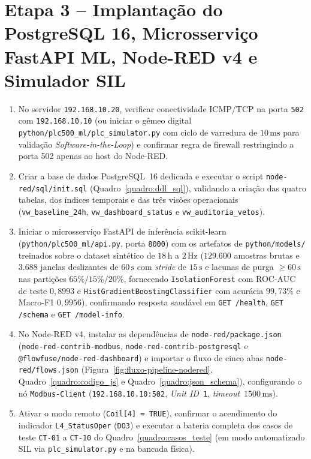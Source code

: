 \section{Etapa 3 -- Implantação do PostgreSQL 16, Microsserviço FastAPI ML, Node-RED v4 e Simulador SIL}
\begin{enumerate}
  \item No servidor \texttt{192.168.10.20}, verificar conectividade ICMP/TCP na porta \texttt{502} com \texttt{192.168.10.10} (ou iniciar o gêmeo digital \texttt{python/\allowbreak plc500\_\allowbreak ml/\allowbreak plc\_\allowbreak simulator.py} com ciclo de varredura de $10\,\text{ms}$ para validação \textit{Software-in-the-Loop}) e confirmar regra de firewall restringindo a porta 502 apenas ao host do Node-RED.
  \item Criar a base de dados PostgreSQL~16 dedicada e executar o script \texttt{node-red/\allowbreak sql/\allowbreak init.sql} (Quadro~\ref{quadro:ddl_sql}), validando a criação das quatro tabelas, dos índices temporais e das três visões operacionais (\texttt{vw\_\allowbreak baseline\_\allowbreak 24h}, \texttt{vw\_\allowbreak dashboard\_\allowbreak status} e \texttt{vw\_\allowbreak auditoria\_\allowbreak vetos}).
  \item Iniciar o microsserviço FastAPI de inferência scikit-learn (\texttt{python/\allowbreak plc500\_\allowbreak ml/\allowbreak api.py}, porta \texttt{8000}) com os artefatos de \texttt{python/\allowbreak models/} treinados sobre o dataset sintético de $18\,\text{h}$ a $2\,\text{Hz}$ ($129.600$ amostras brutas e $3.688$ janelas deslizantes de $60\,\text{s}$ com \textit{stride} de $15\,\text{s}$ e lacunas de purga $\ge 60\,\text{s}$ nas partições $65\%/15\%/20\%$, fornecendo \texttt{Isolation\allowbreak Forest} com ROC-AUC de teste $0{,}8993$ e \texttt{HistGradient\allowbreak Boosting\allowbreak Classifier} com acurácia $99{,}73\%$ e Macro-F1 $0{,}9956$), confirmando resposta saudável em \texttt{GET /health}, \texttt{GET /schema} e \texttt{GET /model-info}.
  \item No Node-RED v4, instalar as dependências de \texttt{node-red/\allowbreak package.json} (\texttt{node-red-\allowbreak contrib-\allowbreak modbus}, \texttt{node-red-\allowbreak contrib-\allowbreak postgresql} e \texttt{@flowfuse/\allowbreak node-red-\allowbreak dashboard}) e importar o fluxo de cinco abas \texttt{node-red/\allowbreak flows.json} (Figura~\ref{fig:fluxo-pipeline-nodered}, Quadro~\ref{quadro:codigo_js} e Quadro~\ref{quadro:json_schema}), configurando o nó \texttt{Modbus-Client} (\texttt{192.168.10.10:502}, \textit{Unit ID}~\texttt{1}, \textit{timeout}~$1500\,\text{ms}$).
  \item Ativar o modo remoto (\texttt{Coil[4] = TRUE}), confirmar o acendimento do indicador \texttt{L4\_StatusOper} (\texttt{DO3}) e executar a bateria completa dos casos de teste \texttt{CT-01} a \texttt{CT-10} do Quadro~\ref{quadro:casos_teste} (em modo automatizado SIL via \texttt{plc\_\allowbreak simulator.py} e na bancada física).
\end{enumerate}
